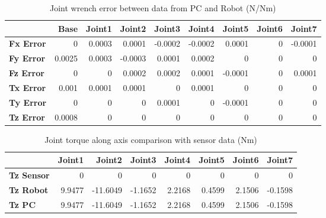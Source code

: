 \begin{table}[h!]
	\centering
	\caption{Joint wrench error between data from PC and Robot (N/Nm)}
	\label{wrech_Error_Pose6}
	\begin{tabular}{|l|r|r|r|r|r|r|r|r|}
		\hline
		\textbf{}  & \textbf{Base} & \textbf{Joint1}  & \textbf{Joint2}  & \textbf{Joint3}  & \textbf{Joint4}  & \textbf{Joint5}  & \textbf{Joint6}  & \textbf{Joint7} \\ \hline
		\textbf{Fx Error}  & 0        & 0.0003        & 0.0001        & -0.0002        & -0.0002        & 0.0001        & 0        & -0.0001 \\ \hline
		\textbf{Fy Error}  & 0.0025        & 0.0003        & -0.0003        & 0.0001        & 0.0002        & 0        & 0        & 0 \\ \hline
		\textbf{Fz Error}  & 0        & 0        & 0.0002        & 0.0002        & 0.0001        & -0.0001        & 0        & 0.0001 \\ \hline
		\textbf{Tx Error}  & 0.001        & 0.0001        & 0.0001        & 0        & 0.0001        & 0        & 0        & 0 \\ \hline
		\textbf{Ty Error}  & 0        & 0        & 0        & 0.0001        & 0        & -0.0001        & 0        & 0 \\ \hline
		\textbf{Tz Error}  & 0.0008        & 0        & 0        & 0        & 0        & 0        & 0        & 0 \\ \hline
	\end{tabular}
\end{table}

\begin{table}[h!]
	\centering
	\caption{Joint torque along axis comparison with sensor data (Nm)}
	\label{wrech_Sensor_Pose6}
	\begin{tabular}{|l|r|r|r|r|r|r|r|}
		\hline
		\textbf{} & \textbf{Joint1} & \textbf{Joint2} & \textbf{Joint3} & \textbf{Joint4} & \textbf{Joint5} & \textbf{Joint6} & \textbf{Joint7} \\ \hline
		\textbf{Tz Sensor}  & 0           & 0           & 0            & 0           & 0           & 0           & 0           \\ \hline
		\textbf{Tz Robot}  	& 9.9477           & -11.6049           & -1.1652            & 2.2168           & 0.4599           & 2.1506           & -0.1598           \\ \hline
		\textbf{Tz PC}  	& 9.9477           & -11.6049           & -1.1652            & 2.2168           & 0.4599           & 2.1506           & -0.1598           \\ \hline
	\end{tabular}
\end{table}

